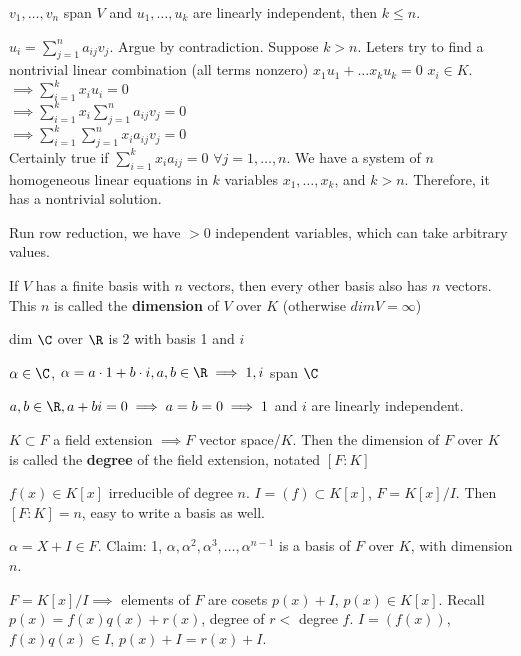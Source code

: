 \documentclass[twoside, 10pt]{article}
\begin{document}
\begin{lem}
    $v_1, \ldots, v_n$ span $V$ and $u_1, \ldots, u_k$ are linearly independent, then $k \leq n$.
\end{lem}
$u_i = \sum\limits_{j = 1}^n a_{ij}v_j$. Argue by contradiction. Suppose $k > n$. Leters try to find a nontrivial linear combination (all terms nonzero) $x_1u_1 + \ldots x_ku_k = 0$ $x_i \in K$.\\
$\implies \sum\limits_{i=1}^k x_iu_i = 0$\\
$\implies \sum\limits_{i=1}^k x_i\sum\limits_{j = 1}^n a_{ij}v_j = 0$\\
$\implies \sum\limits_{i=1}^k\sum\limits_{j = 1}^n x_ia_{ij}v_j = 0$\\
Certainly true if $\sum\limits_{i = 1}^k x_ia_{ij} = 0$ $\forall j = 1,\ldots, n$. We have a system of $n$ homogeneous linear equations in $k$ variables $x_1, \ldots, x_k$, and $k > n$. Therefore, it has a nontrivial solution.

Run row reduction, we have $> 0$ independent variables, which can take arbitrary values.
\begin{cor}
    If $V$ has a finite basis with $n$ vectors, then every other basis also has $n$ vectors. This $n$ is called the \textbf{dimension} of $V$ over $K$ (otherwise $dim V = \infty$)
\end{cor}

\begin{exm*}
    dim $\C$ over $\R$ is 2 with basis 1 and $i$
\end{exm*}
$\alpha \in \C$, $\alpha = a \cdot 1 + b \cdot i, a, b \in \R \implies 1, i$ span $\C$

$a, b\in \R, a + bi = 0\implies a = b = 0 \implies 1$ and $i$ are linearly independent. 

\begin{defn}
    $K \subset F$ a field extension $\implies F$ vector space/$K$. Then the dimension of $F$ over $K$ is called the \textbf{degree} of the field extension, notated $\left[F : K\right]$
\end{defn}

\begin{lem}
    $f(x) \in K[x]$ irreducible of degree $n$. $I = (f) \subset K[x]$, $F = K[x]/I$. Then $[F : K] = n$, easy to write a basis as well.
\end{lem}
$\alpha = X + I \in F$. Claim: 1, $\alpha, \alpha^2, \alpha^3, \ldots, \alpha^{n-1}$ is a basis of $F$ over $K$, with dimension $n$.

$F = K[x]/I \implies$ elements of $F$ are cosets $p(x) + I$, $p(x) \in K[x]$. Recall $p(x) =f(x)q(x) + r(x)$, degree of $r <$ degree $f$. $I = (f(x))$, $f(x)q(x) \in I$, $p(x) + I = r(x) + I$. 
\end{document}
